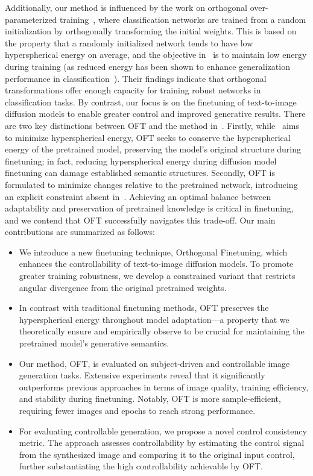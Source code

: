 Additionally, our method is influenced by the work on orthogonal over-parameterized training~\cite{liu2021orthogonal}, where classification networks are trained from a random initialization by orthogonally transforming the initial weights. This is based on the property that a randomly initialized network tends to have low hyperspherical energy on average, and the objective in~\cite{liu2021orthogonal} is to maintain low energy during training (as reduced energy has been shown to enhance generalization performance in classification~\cite{liu2018learning,lin2020regularizing}). Their findings indicate that orthogonal transformations offer enough capacity for training robust networks in classification tasks. By contrast, our focus is on the finetuning of text-to-image diffusion models to enable greater control and improved generative results. There are two key distinctions between OFT and the method in~\cite{liu2021orthogonal}. Firstly, while~\cite{liu2021orthogonal} aims to minimize hyperspherical energy, OFT seeks to conserve the hyperspherical energy of the pretrained model, preserving the model’s original structure during finetuning; in fact, reducing hyperspherical energy during diffusion model finetuning can damage established semantic structures. Secondly, OFT is formulated to minimize changes relative to the pretrained network, introducing an explicit constraint absent in~\cite{liu2021orthogonal}. Achieving an optimal balance between adaptability and preservation of pretrained knowledge is critical in finetuning, and we contend that OFT successfully navigates this trade-off. Our main contributions are summarized as follows:

\begin{itemize}[leftmargin=*,nosep]

    \item We introduce a new finetuning technique, Orthogonal Finetuning, which enhances the controllability of text-to-image diffusion models. To promote greater training robustness, we develop a constrained variant that restricts angular divergence from the original pretrained weights.
    \item In contrast with traditional finetuning methods, OFT preserves the hyperspherical energy throughout model adaptation—a property that we theoretically ensure and empirically observe to be crucial for maintaining the pretrained model’s generative semantics.
    \item Our method, OFT, is evaluated on subject-driven and controllable image generation tasks. Extensive experiments reveal that it significantly outperforms previous approaches in terms of image quality, training efficiency, and stability during finetuning. Notably, OFT is more sample-efficient, requiring fewer images and epochs to reach strong performance.
    \item For evaluating controllable generation, we propose a novel control consistency metric. The approach assesses controllability by estimating the control signal from the synthesized image and comparing it to the original input control, further substantiating the high controllability achievable by OFT.
\end{itemize}

